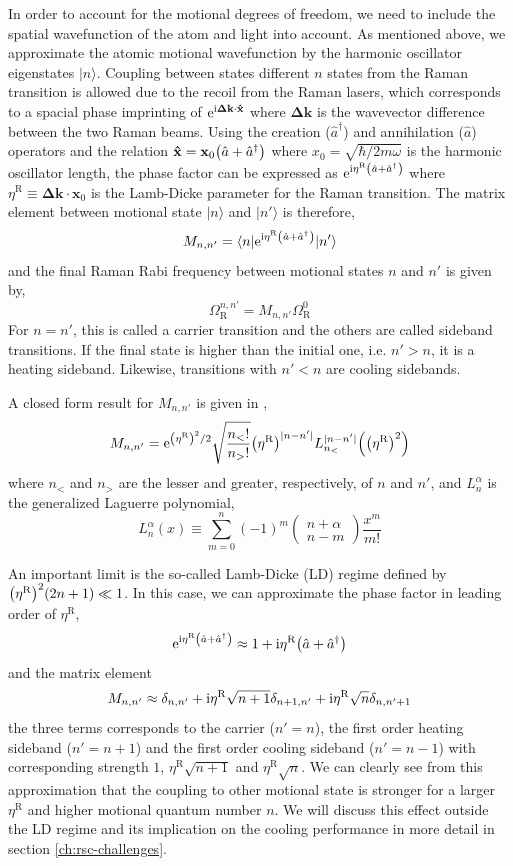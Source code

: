 In order to account for the motional degrees of freedom, we need to include the spatial
wavefunction of the atom and light into account.
As mentioned above, we approximate the atomic motional wavefunction by the harmonic oscillator
eigenstates $|n\rangle$. Coupling between states different $n$ states from the Raman transition
is allowed due to the recoil from the Raman lasers,
which corresponds to a spacial phase imprinting of $\mathrm{e}^{\mathrm{i}\mathbf{\Delta k}\cdot\mathbf{\hat x}}$
where $\mathbf{\Delta k}$ is the wavevector difference between the two Raman beams.
Using the creation ($\hat a^\dagger$) and annihilation ($\hat a$) operators and the relation
$\mathbf{\hat x}=\mathbf{x}_0{\left({\hat a+\hat a^\dagger}\right)}$ where $x_0=\sqrt{\hbar/2m\omega}$
is the harmonic oscillator length, the phase factor can be expressed as
$\mathrm{e}^{\mathrm{i}\eta^{\mathrm{R}}{\left({\hat a+\hat a^\dagger}\right)}}$ where $\eta^{\mathrm{R}}\equiv\mathbf{\Delta k}\cdot\mathbf{x}_0$
is the Lamb-Dicke parameter for the Raman transition.
The matrix element between motional state $|n\rangle$ and $|n'\rangle$ is therefore,
\[ M_{n,n'}=\langle n|\mathrm{e}^{\mathrm{i}\eta^{\mathrm{R}}{\left({\hat a+\hat a^\dagger}\right)}}|n'\rangle \]
and the final Raman Rabi frequency between motional states $n$ and $n'$ is given by,
\[ \Omega_{\mathrm{R}}^{n,n'}=M_{n,n'}\Omega_{\mathrm{R}}^0 \]
For $n=n'$, this is called a carrier transition and the others are called sideband transitions.
If the final state is higher than the initial one, i.e. $n'>n$, it is a heating sideband.
Likewise, transitions with $n'<n$ are cooling sidebands.

A closed form result for $M_{n,n'}$ is given in \cite{wineland_experimental_1998},
\[ M_{n,n'}=\mathrm{e}^{{\left({\eta^{\mathrm{R}}}\right)}^2/2}\sqrt{\frac{n_<!}{n_>!}}{\left({\eta^{\mathrm{R}}}\right)}^{|n-n'|}L_{n_<}^{|n-n'|}{\left({{\left({\eta^{\mathrm{R}}}\right)}^2}\right)} \]
where $n_<$ and $n_>$ are the lesser and greater, respectively, of $n$ and $n'$,
and $L_n^\alpha$ is the generalized Laguerre polynomial,
\[ L_n^\alpha(x)\equiv\sum_{m=0}^n(-1)^m\begin{pmatrix}n+\alpha\\n-m\end{pmatrix}\frac{x^m}{m!} \]

An important limit is the so-called Lamb-Dicke (LD) regime defined by ${\left({\eta^{\mathrm{R}}}\right)}^2(2n+1)\ll 1$.
In this case, we can approximate the phase factor in leading order of $\eta^{\mathrm{R}}$,
\[ \mathrm{e}^{\mathrm{i}\eta^{\mathrm{R}}{\left({\hat a+\hat a^\dagger}\right)}}\approx1+\mathrm{i}\eta^{\mathrm{R}}{\left({\hat a+\hat a^\dagger}\right)} \]
and the matrix element
\[ M_{n,n'}\approx\delta_{n,n'}+\mathrm{i}\eta^{\mathrm{R}}\sqrt{n+1}\delta_{n+1,n'}+\mathrm{i}\eta^{\mathrm{R}}\sqrt{n}\delta_{n,n'+1} \]
the three terms corresponds to the carrier ($n'=n$),
the first order heating sideband ($n'=n+1$)
and the first order cooling sideband ($n'=n-1$) with corresponding strength
$1$, $\eta^{\mathrm{R}}\sqrt{n+1}$ and $\eta^{\mathrm{R}}\sqrt{n}$.
We can clearly see from this approximation that the coupling to other motional state
is stronger for a larger $\eta^{\mathrm{R}}$ and higher motional quantum number $n$.
We will discuss this effect outside the LD regime and its implication
on the cooling performance in more detail in section \ref{ch:rsc-challenges}.

